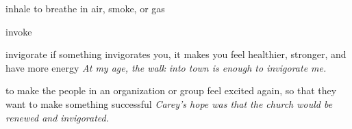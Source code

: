 \begin{DefWord}{inhale}
    to breathe in air, smoke, or gas
\end{DefWord}

\begin{DefWord}{invoke}
\end{DefWord}

\begin{DefWord}{invigorate}
    if something invigorates you, it makes you feel healthier, stronger, and have more energy
    \textit{At my age, the walk into town is enough to invigorate me.}

    to make the people in an organization or group feel excited again, so that they want to make something successful
    \textit{Carey's hope was that the church would be renewed and invigorated.}
\end{DefWord}